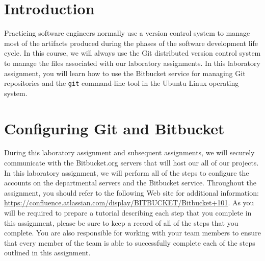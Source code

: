 

\usepackage[compact]{titlesec}



\section*{Introduction}

Practicing software engineers normally use a version control system to manage most of the artifacts produced during the
phases of the software development life cycle.  In this course, we will always use the Git distributed version control
system to manage the files associated with our laboratory assignments.  In this laboratory assignment, you will learn
how to use the Bitbucket service for managing Git repositories and the {\tt git} command-line tool in the Ubuntu Linux
operating system.

\section*{Configuring Git and Bitbucket}

During this laboratory assignment and subsequent assignments, we will securely communicate with the Bitbucket.org
servers that will host our all of our projects.  In this laboratory assignment, we will perform all of the steps to
configure the accounts on the departmental servers and the Bitbucket service.  Throughout the assignment, you should
refer to the following Web site for additional information:
\url{https://confluence.atlassian.com/display/BITBUCKET/Bitbucket+101}.  As you will be required to prepare a tutorial
describing each step that you complete in this assignment, please be sure to keep a record of all of the steps that you
complete.  You are also responsible for working with your team members to ensure that every member of the team is able
to successfully complete each of the steps outlined in this assignment.

